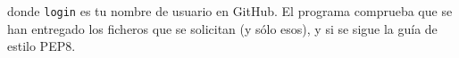 \documentclass[11pt,a4paper]{article}
\begin{document}
donde \texttt{login} es tu nombre de usuario en GitHub. El programa comprueba que se han entregado los ficheros que se solicitan (y sólo esos), y si se sigue la guía de estilo PEP8. 

\vspace{1cm}

\end{document}
